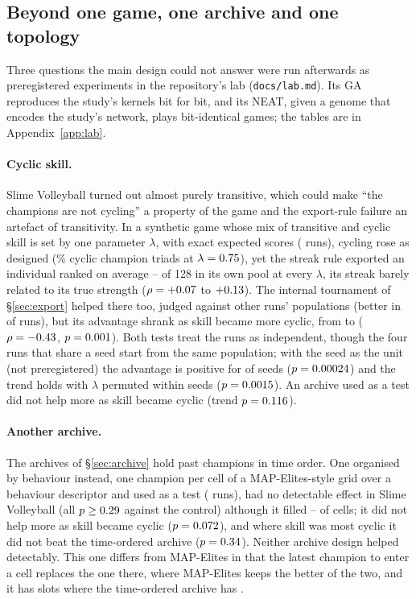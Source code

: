 \documentclass[11pt]{article}
\begin{document}
\subsection{Beyond one game, one archive and one topology}
\label{sec:robust}

Three questions the main design could not answer were run afterwards as
preregistered experiments in the repository's lab (\texttt{docs/lab.md}). Its
GA reproduces the study's kernels bit for bit, and its NEAT, given a genome
that encodes the study's network, plays bit-identical games; the tables are in
Appendix~\ref{app:lab}.

\paragraph{Cyclic skill.} Slime Volleyball turned out almost purely
transitive, which could make ``the champions are not cycling'' a property of
the game and the export-rule failure an artefact of transitivity. In a
synthetic game whose mix of transitive and cyclic skill is set by one
parameter $\lambda$, with exact expected scores (\nLabRuns{} runs), cycling rose
as designed (\nLabCycHiPct\% cyclic champion triads at
$\lambda=0.75$), yet the streak rule exported an individual ranked on
average \nLabRankMin--\nLabRankMax{} of 128 in its own pool at every $\lambda$,
its streak barely related to its true strength ($\rho=+0.07$ to
$+0.13$). The internal tournament of \S\ref{sec:export} helped
there too, judged against other runs' populations (better in \nXmImproved{} of
\nXmN{} runs), but its advantage shrank as skill became more cyclic, from
\nXmAdvLow{} to \nXmAdvHigh{} ($\rho=-0.43$, $p=0.001$). Both tests treat
the runs as independent, though the four runs that share a seed start from the
same population; with the seed as the unit (not preregistered) the advantage
is positive for \nXrCImproved{} of \nXrCSeeds{} seeds ($p=0.00024$) and the
trend holds with $\lambda$ permuted within seeds ($p=0.0015$). An archive used
as a test did not help more as skill became cyclic (trend $p=0.116$).

\paragraph{Another archive.} The archives of \S\ref{sec:archive} hold past
champions in time order. One organised by behaviour instead, one champion per
cell of a MAP-Elites-style grid over a behaviour descriptor and used as a test
(\nQdRuns{} runs), had no detectable effect in Slime Volleyball (all
$p\geq0.29$ against the control) although it filled
\nQdCellsMin--\nQdCellsMax{} of \nQdCapacity{} cells; it did not help more as
skill became cyclic ($p=0.072$), and where skill was most cyclic it did
not beat the time-ordered archive ($p=0.34$). Neither archive design helped
detectably. This one differs from MAP-Elites in that the latest champion to
enter a cell replaces the one there, where MAP-Elites keeps the better of the
two, and it has \nQdCapacity{} slots where the time-ordered archive has
\nHoftestCapacity.
\end{document}
